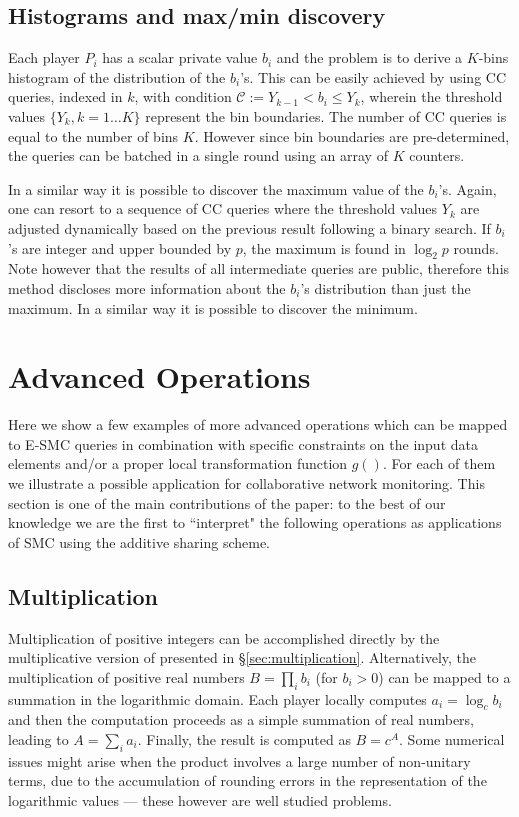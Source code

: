 \documentclass{sig-alternate}
\begin{document}
 \subsection{Histograms and max/min discovery}\label{sec:binhist}
Each player $P_i$ has a scalar private value  $b_i$ 
and the problem is to derive a $K$-bins histogram of the distribution of the $b_i$'s. This can be easily achieved 
by using  CC queries, indexed in $k$, with condition $\mathcal{C} := Y_{k-1} < b_i \leq Y_k$, wherein the threshold values $\{ Y_k, k=1 \ldots K\}$ represent the bin boundaries. 
The number of CC queries is equal to the number of bins $K$. However since bin boundaries are pre-determined, the queries can be batched in a single round using an array of $K$ counters. 


In a similar way it is possible to discover the maximum value of the $b_i$'s.
Again, one can resort to a sequence of  CC queries where the threshold values $Y_k$ are adjusted dynamically based on the previous result following a binary search.  If $b_i$'s are integer and upper bounded by $p$, the maximum is found in $\log_2{p}$ rounds. 
Note however that the results of all intermediate queries are public, therefore this method discloses more information about the $b_i$'s distribution than just the maximum. 
In a similar way it is possible to discover the minimum. 


\section{Advanced Operations}\label{sec:operations-advanced}

Here we show a few examples of more advanced operations which can be mapped to E-SMC queries in combination with specific constraints on the input data elements and/or a proper local transformation function $g()$. 
For each of them we illustrate a possible application for  collaborative network monitoring.
This section is one of the main contributions of the paper: to the best of our knowledge we are the first to ``interpret" the following operations as applications of SMC using the additive sharing scheme. 


\subsection{Multiplication}Multiplication of positive integers can be accomplished directly by the multiplicative version of \ata presented in \S \ref{sec:multiplication}.
Alternatively, 
the multiplication of positive real numbers $B=\prod_i{b_i}$ (for $b_i > 0$)  can be mapped to a summation in  the logarithmic domain. Each player locally computes $a_i = \log_c{b_i}$ 
and then the computation proceeds as a simple summation of real numbers, leading to $A = \sum_i{a_i}$. Finally, the result is computed as $B=c^{A}$. 
Some numerical issues might arise when the product involves a large number of non-unitary terms, due to the accumulation of rounding errors in the representation of the logarithmic values --- these however are well studied problems. 
\end{document}
